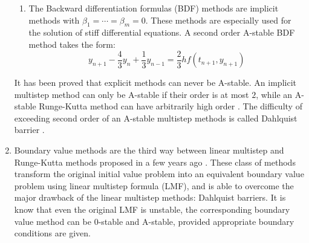 \begin{enumerate}
\begin{enumerate}
\item The Backward differentiation formulas (BDF) methods are implicit methods with $\beta_1 = \cdots = \beta_m = 0$. These methods are especially used for the solution of stiff differential equations. A second order A-stable BDF method takes the form:
\begin{equation}
y_{n+1} - \frac{4}{3}y_{n} + \frac{1}{3}y_{n-1} = \frac{2}{3}hf(t_{n+1},y_{n+1})
\end{equation}
\end{enumerate}
It has been proved that explicit methods can never be A-stable. An implicit multistep method can only be A-stable if their order is at most $2$, while an A-stable Runge-Kutta method can have arbitrarily high order \cite{Hairer1993}. The difficulty of exceeding second order of an A-stable multistep methods is called Dahlquist barrier \cite{Dahlquist1963, Dahlquist1956}.

\item Boundary value methods are the third way between linear multistep and Runge-Kutta methods proposed in a few years ago \cite{Brugnano1998}. These class of methods transform the original initial value problem into an equivalent boundary value problem using linear multistep formula (LMF), and is able to overcome the major drawback of the linear multistep methods: Dahlquist barriers. It is know that even the original LMF is unstable, the corresponding boundary value method can be $0$-stable and A-stable, provided appropriate boundary conditions are given.
\end{enumerate}


